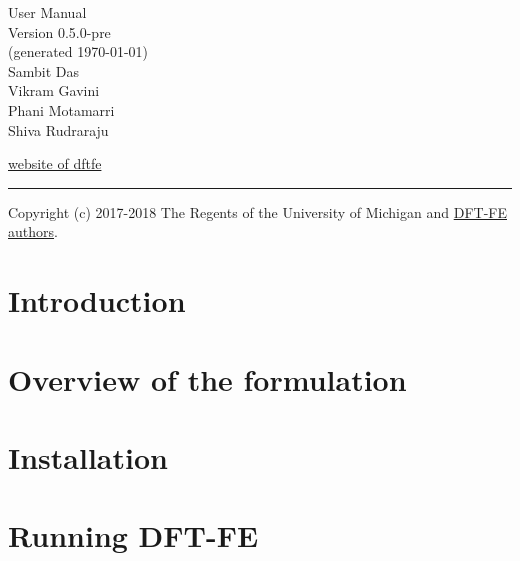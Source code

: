 \documentclass{article}
\newcommand{\dftfe}{\textsc{DFT-FE}}
\begin{document}
{%
\color{dark_grey}
\hfill{\Huge \fontfamily{\sfdefault}\selectfont User Manual \\
\raggedleft \huge \fontfamily{\sfdefault}\selectfont Version
0.5.0-pre %
\\\large(generated \today)\\
{\Large Sambit Das\\Vikram Gavini\\Phani Motamarri\\ Shiva Rudraraju\\}
}

\null
\vspace{17em}

{\noindent
{\fontfamily{\sfdefault}\selectfont \href{https://dftfe.org}{website of dftfe}}
}


{\noindent
\color{dark_grey}
\rule{\textwidth}{2pt}
}

}
Copyright (c) 2017-2018 The Regents of the University of Michigan and \hyperref[sec:authors]{DFT-FE authors}.
\pagebreak
{}


\pagebreak

\tableofcontents

\pagebreak

\section{Introduction}
\label{sec:intro}


\section{Overview of the formulation}
\label{sec:intro}


\section{Installation}
\label{sec:installation}


\section{Running \dftfe}
\label{sec:run}

\end{document}
